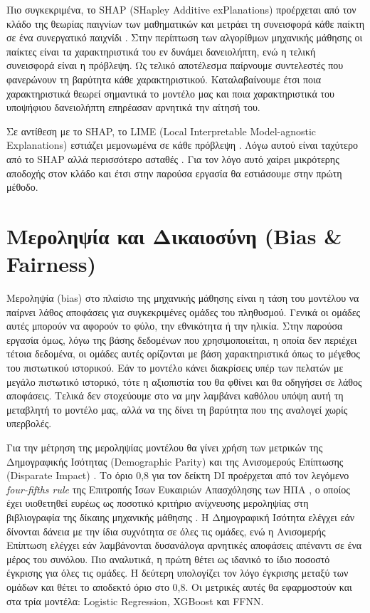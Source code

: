 Πιο συγκεκριμένα, το SHAP (SHapley Additive exPlanations) προέρχεται
από τον κλάδο της θεωρίας παιγνίων των μαθηματικών και μετράει τη συνεισφορά κάθε
παίκτη σε ένα συνεργατικό παιχνίδι \citep{lundberg2017shap}. Στην
περίπτωση των αλγορίθμων μηχανικής μάθησης οι παίκτες είναι τα
χαρακτηριστικά του εν δυνάμει δανειολήπτη, ενώ η τελική συνεισφορά
είναι η πρόβλεψη. Ως τελικό αποτέλεσμα παίρνουμε συντελεστές που
φανερώνουν τη βαρύτητα κάθε χαρακτηριστικού. Καταλαβαίνουμε έτσι
ποια χαρακτηριστικά θεωρεί σημαντικά το μοντέλο μας και ποια
χαρακτηριστικά του υποψήφιου δανειολήπτη επηρέασαν αρνητικά την
αίτησή του.

Σε αντίθεση με το SHAP, το LIME (Local Interpretable Model-agnostic
Explanations) εστιάζει μεμονωμένα σε κάθε πρόβλεψη
\citep{ribeiro2016lime}. Λόγω αυτού είναι ταχύτερο από το SHAP αλλά
περισσότερο ασταθές \citep{alvarez2018robustness, slack2020fooling}.
Για τον λόγο αυτό χαίρει μικρότερης αποδοχής
στον κλάδο και έτσι στην παρούσα εργασία θα εστιάσουμε στην πρώτη
μέθοδο.

\section{Μεροληψία και Δικαιοσύνη (Bias \& Fairness)}
\label{sec:bias}

Μεροληψία (bias) στο πλαίσιο της μηχανικής μάθησης είναι η τάση του
μοντέλου να παίρνει λάθος αποφάσεις για συγκεκριμένες ομάδες του
πληθυσμού. Γενικά οι ομάδες αυτές μπορούν να αφορούν το φύλο, την
εθνικότητα ή την ηλικία. Στην παρούσα εργασία όμως, λόγω της βάσης
δεδομένων που χρησιμοποιείται, η οποία δεν περιέχει τέτοια δεδομένα,
οι ομάδες αυτές ορίζονται με βάση χαρακτηριστικά όπως το μέγεθος του
πιστωτικού ιστορικού. Εάν το μοντέλο κάνει διακρίσεις υπέρ των
πελατών με μεγάλο πιστωτικό ιστορικό, τότε η αξιοπιστία του θα φθίνει
και θα οδηγήσει σε λάθος αποφάσεις. Τελικά δεν στοχεύουμε στο να μην
λαμβάνει καθόλου υπόψη αυτή τη μεταβλητή το μοντέλο μας, αλλά να της
δίνει τη βαρύτητα που της αναλογεί χωρίς υπερβολές.

Για την μέτρηση της μεροληψίας μοντέλου θα γίνει χρήση των μετρικών
της Δημογραφικής Ισότητας (Demographic Parity) και της Ανισομερούς
Επίπτωσης (Disparate Impact) \citep{barocas2019fairness}.
Το όριο 0{,}8 για τον δείκτη DI προέρχεται από τον λεγόμενο \textit{four-fifths rule} 
της Επιτροπής Ίσων Ευκαιριών Απασχόλησης των ΗΠΑ \citep{eeoc1978uniform}, ο οποίος 
έχει υιοθετηθεί ευρέως ως ποσοτικό κριτήριο ανίχνευσης μεροληψίας στη βιβλιογραφία 
της δίκαιης μηχανικής μάθησης \citep{feldman2015certifying, dwork2012fairness}. Η
Δημογραφική Ισότητα ελέγχει εάν δίνονται δάνεια με την ίδια συχνότητα
σε όλες τις ομάδες, ενώ η Ανισομερής Επίπτωση ελέγχει εάν
λαμβάνονται δυσανάλογα αρνητικές αποφάσεις απέναντι σε ένα μέρος του
συνόλου. Πιο αναλυτικά, η πρώτη θέτει ως ιδανικό το ίδιο ποσοστό
έγκρισης για όλες τις ομάδες. Η δεύτερη υπολογίζει τον λόγο έγκρισης
μεταξύ των ομάδων και θέτει το αποδεκτό όριο στο 0,8. Οι μετρικές
αυτές θα εφαρμοστούν και στα τρία μοντέλα: Logistic Regression,
XGBoost και FFNN.


